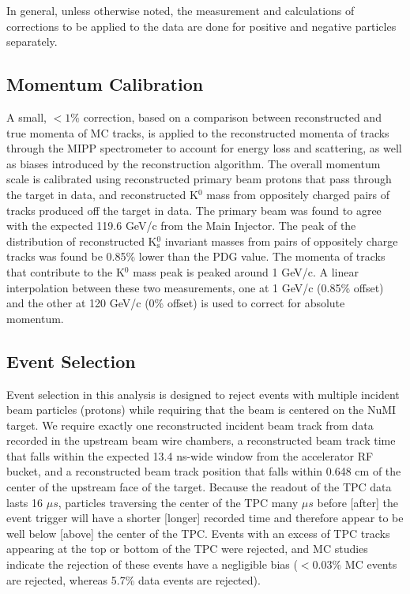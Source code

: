 \documentclass[%
aps, prd, reprint, show pacs, preprint numbers, ams math, amssymb, superscriptaddress, linenumbers]{revtex4-1}
\begin{document}
In general, unless otherwise noted, the measurement and calculations of corrections to be applied to the data are done for positive and negative particles separately.

\subsection{Momentum Calibration}
A small, $< 1\%$ correction, based on a comparison between reconstructed and true momenta of MC tracks, is applied to 
the reconstructed momenta of tracks through the MIPP spectrometer to account for energy loss and scattering, as well as biases introduced by the reconstruction algorithm.  The overall momentum scale is calibrated using reconstructed primary beam protons that pass through the target in data, and reconstructed K$^0$ mass from oppositely charged pairs of tracks produced off the target in data.  The primary beam was found to agree with the expected 119.6 GeV/c from the Main Injector.  The peak of the distribution of reconstructed K$^0_\mathrm{s}$ invariant masses from pairs of oppositely charge tracks was found be 0.85\% lower than the PDG value.  The momenta of tracks that contribute to the K$^0$ mass peak is peaked around 1 GeV/c.  A linear interpolation between these two measurements, one at 1 GeV/c (0.85\% offset) and the other at 120 GeV/c (0\% offset) is used to correct for absolute momentum.

\subsection{Event Selection}
Event selection in this analysis is designed to reject events with multiple incident beam particles (protons)  while requiring that the beam is centered on the NuMI target.  We require exactly one reconstructed incident beam track from data recorded in the upstream beam wire chambers, a reconstructed beam track time that falls within the expected 13.4 ns-wide window from the accelerator RF bucket, %
and a reconstructed beam track position that falls within 0.648 cm of the center of the upstream face of the target.   
Because the readout of the TPC data lasts 16 $\mu s$, particles traversing the center of the TPC many $\mu s$ before [after] the event trigger will have a shorter [longer] recorded time and therefore appear to be well below [above] the center of the TPC.  Events with an excess of TPC tracks appearing at the top or bottom of the TPC were rejected, and MC studies indicate the rejection of these events have a negligible bias ($< 0.03\%$ MC events are rejected, whereas 5.7\% data events are rejected).
\end{document}
